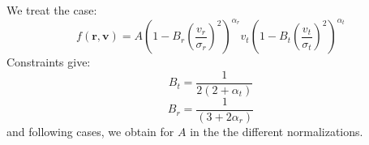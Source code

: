 We treat the case:
%
\begin{equation}
    f\left(\textbf{r},\textbf{v}\right)=
    A{\left(1-B_r{\left(\frac{v_r}{\sigma_r}\right)}^2\right)}^{\alpha_r}
    v_t{\left(1-B_t{\left(\frac{v_t}{\sigma_t}\right)}^2\right)}^{\alpha_t}
\end{equation}
%
Constraints give:
%
\begin{equation}
    B_t=
    \frac{1}{2\left(2+\alpha_t\right)}
\end{equation}
%
\begin{equation}
    B_r=
    \frac{1}{\left(3+2\alpha_r\right)}
\end{equation}
%
and following cases, we obtain for $A$ in the  the
different normalizations.
%
\begin{table}[htb]
    \centering
    \caption{Table of coefficient for the normalization in different
        cases.\label{tab:tsallis}}
\end{table}

